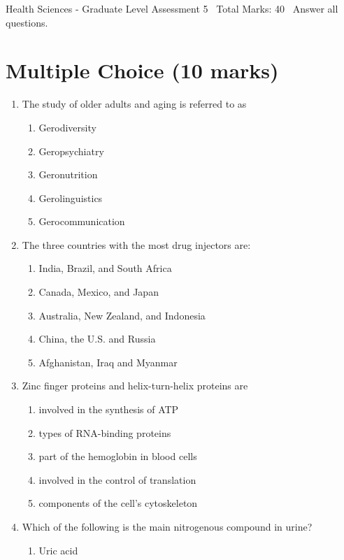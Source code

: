 \documentclass[12pt]{article}
\begin{document}
\begin{center}
Health Sciences - Graduate Level Assessment 5 \
Total Marks: 40 \
Answer all questions.
\end{center}

\section*{Multiple Choice (10 marks)}
\begin{enumerate}[label=\arabic*.]
\item The study of older adults and aging is referred to as
\begin{enumerate}[label=(\alph*)]
    \item Gerodiversity
    \item Geropsychiatry
    \item Geronutrition
    \item Gerolinguistics
    \item Gerocommunication
\end{enumerate}
\item The three countries with the most drug injectors are:
\begin{enumerate}[label=(\alph*)]
    \item India, Brazil, and South Africa
    \item Canada, Mexico, and Japan
    \item Australia, New Zealand, and Indonesia
    \item China, the U.S. and Russia
    \item Afghanistan, Iraq and Myanmar
\end{enumerate}
\item Zinc finger proteins and helix-turn-helix proteins are
\begin{enumerate}[label=(\alph*)]
    \item involved in the synthesis of ATP
    \item types of RNA-binding proteins
    \item part of the hemoglobin in blood cells
    \item involved in the control of translation
    \item components of the cell's cytoskeleton
\end{enumerate}
\item Which of the following is the main nitrogenous compound in urine?
\begin{enumerate}[label=(\alph*)]
    \item Uric acid

\end{enumerate}
\end{enumerate}
\end{document}
